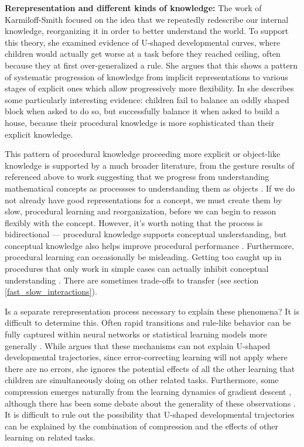 \textbf{Rerepresentation and different kinds of knowledge:} The work of Karmiloff-Smith \citep[e.g.][]{Karmiloff-Smith1986, Karmiloff-Smith1992, Clark1993} focused on the idea that we repeatedly redescribe our internal knowledge, reorganizing it in order to better understand the world. To support this theory, she examined evidence of U-shaped developmental curves, where children would actually get worse at a task before they reached ceiling, often because they at first over-generalized a rule. She argues that this shows a pattern of systematic progression of knowledge from implicit representations to various stages of explicit ones which allow progressively more flexibility. In \citet{Karmiloff-Smith1986} she describes some particularly interesting evidence: children fail to balance an oddly shaped block when asked to do so, but successfully balance it when asked to build a house, because their procedural knowledge is more sophisticated than their explicit knowledge. \par 
This pattern of procedural knowledge proceeding more explicit or object-like knowledge is supported by a much broader literature, from the gesture results of \citet{Goldin-Meadow1993} referenced above to work suggesting that we progress from understanding mathematical concepts as processses to understanding them as objects \citep{Dubinsky1991, Hazzan1999}. If we do not already have good representations for a concept, we must create them by slow, procedural learning and reorganization, before we can begin to reason flexibly with the concept. However, it's worth noting that the process is bidirectional --- procedural knowledge supports conceptual understanding, but conceptual knowledge also helps improve procedural performance \citep{Rittle-Johnson2001}. Furthermore, procedural learning can occasionally be misleading. Getting too caught up in procedures that only work in simple cases can actually inhibit conceptual understanding \citep{McNeil2005}. There are sometimes trade-offs to transfer (see section \ref{fast_slow_interactions}). \par 
Is a separate rerepresentation process necessary to explain these phenomena? It is difficult to determine this. Often rapid transitions and rule-like behavior can be fully captured within neural networks or statistical learning models more generally \citep[e.g.][]{McClelland1999, McClelland2002, Schapiro2009, Aslin2012}. While \citet{Karmiloff-Smith1992} argues that these mechanisms can not explain U-shaped developmental trajectories, since error-correcting learning will not apply where there are no errors, she ignores the potential effects of all the other learning that children are simultaneously doing on other related tasks. Furthermore, some compression emerges naturally from the learning dynamics of gradient descent \citep{Tishby2015, Shwartz-Ziv2017, Achille2017}, although there has been some debate about the generality of these observations \citep[][see]{Saxe2018a}. It is difficult to rule out the possibility that U-shaped developmental trajectories can be explained by the combination of compression and the effects of other learning on related tasks. \par
